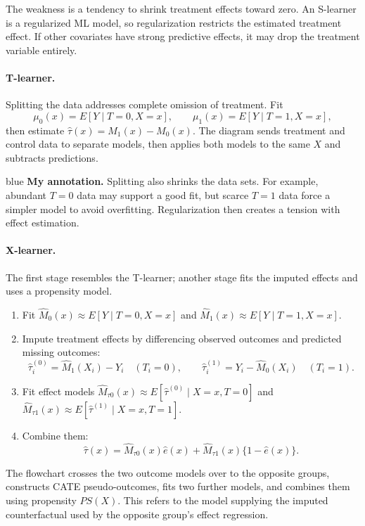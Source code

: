 {The weakness is a tendency to shrink treatment effects toward zero. An S-learner is a regularized ML model, so regularization restricts the estimated treatment effect. If other covariates have strong predictive effects, it may drop the treatment variable entirely.

\paragraph{T-learner.}
Splitting the data addresses complete omission of treatment. Fit
\[\mu_0(x)=E[Y\mid T=0,X=x],\qquad \mu_1(x)=E[Y\mid T=1,X=x],\]
then estimate $\hat\tau(x)=M_1(x)-M_0(x)$. The diagram sends treatment and control data to separate models, then applies both models to the same $X$ and subtracts predictions.

\begin{inkblock}{blue}
\textbf{My annotation.} Splitting also shrinks the data sets. For example, abundant $T=0$ data may support a good fit, but scarce $T=1$ data force a simpler model to avoid overfitting. Regularization then creates a tension with effect estimation.
\end{inkblock}

\paragraph{X-learner.}
The first stage resembles the T-learner; another stage fits the imputed effects and uses a propensity model.
\begin{enumerate}
\item Fit $\hat M_0(x)\approx E[Y\mid T=0,X=x]$ and $\hat M_1(x)\approx E[Y\mid T=1,X=x]$. 
\item Impute treatment effects by differencing observed outcomes and predicted missing outcomes:
\[\hat\tau_i^{(0)}=\hat M_1(X_i)-Y_i\quad(T_i=0),\qquad
\hat\tau_i^{(1)}=Y_i-\hat M_0(X_i)\quad(T_i=1).
\]
\item Fit effect models $\hat M_{\tau0}(x)\approx E[\hat\tau^{(0)}\mid X=x,T=0]$ and $\hat M_{\tau1}(x)\approx E[\hat\tau^{(1)}\mid X=x,T=1]$.
\item Combine them:
\[\hat\tau(x)=\hat M_{\tau0}(x)\hat e(x)+\hat M_{\tau1}(x)\{1-\hat e(x)\}.\]
\end{enumerate}
The flowchart crosses the two outcome models over to the opposite groups, constructs CATE pseudo-outcomes, fits two further models, and combines them using propensity $PS(X)$.  This refers to the model supplying the imputed counterfactual used by the opposite group's effect regression.

}
